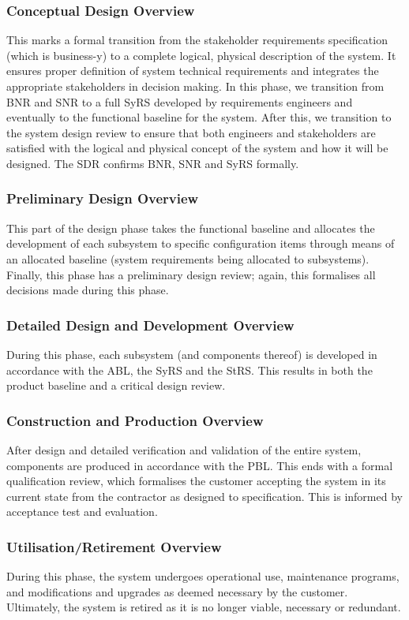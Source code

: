 \documentclass[journal]{IEEEtran}
\begin{document}
\subsubsection{Conceptual Design Overview}
This marks a formal transition from the stakeholder requirements specification (which is business-y) to a complete logical, physical description of the system. It ensures proper definition of system technical requirements and integrates the appropriate stakeholders in decision making. In this phase, we transition from BNR and SNR to a full SyRS developed by requirements engineers and eventually to the functional baseline for the system. After this, we transition to the system design review to ensure that both engineers and stakeholders are satisfied with the logical and physical concept of the system and how it will be designed. The SDR confirms BNR, SNR and SyRS formally.
\subsubsection{Preliminary Design Overview}
This part of the design phase takes the functional baseline and allocates the development of each subsystem to specific configuration items through means of an allocated baseline (system requirements being allocated to subsystems). Finally, this phase has a preliminary design review; again, this formalises all decisions made during this phase.
\subsubsection{Detailed Design and Development Overview}
During this phase, each subsystem (and components thereof) is developed in accordance with the ABL, the SyRS and the StRS. This results in both the product baseline and a critical design review.
\subsubsection{Construction and Production Overview}
After design and detailed verification and validation of the entire system, components are produced in accordance with the PBL. This ends with a formal qualification review, which formalises the customer accepting the system in its current state from the contractor as designed to specification. This is informed by acceptance test and evaluation.
\subsubsection{Utilisation/Retirement Overview}
During this phase, the system undergoes operational use, maintenance programs, and modifications and upgrades as deemed necessary by the customer. Ultimately, the system is retired as it is no longer viable, necessary or redundant.
\end{document}
